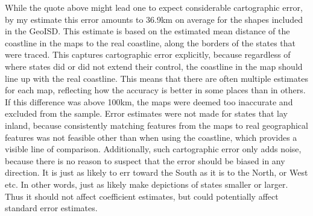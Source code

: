 While the quote above might lead one to expect considerable cartographic error,
by my estimate this error amounts to 36.9km on average for the shapes included
in the GeoISD. This estimate is based on the estimated mean distance of the
coastline in the maps to the real coastline, along the borders of the states
that were traced. This captures cartographic error explicitly, because
regardless of where states did or did not extend their control, the coastline in
the map should line up with the real coastline. This means that there are often
multiple estimates for each map, reflecting how the accuracy is better in some
places than in others. If this difference was above 100km, the maps were deemed
too inaccurate and excluded from the sample. Error estimates were not made for
states that lay inland, because consistently matching features from the maps to
real geographical features was not feasible other than when using the coastline,
which provides a visible line of comparison. Additionally, such cartographic
error only adds noise, because there is no reason to suspect that the error
should be biased in any direction. It is just as likely to err toward the South
as it is to the North, or West etc. In other words, just as likely make
depictions of states smaller or larger. Thus it should not affect coefficient
estimates, but could potentially affect standard error estimates.


